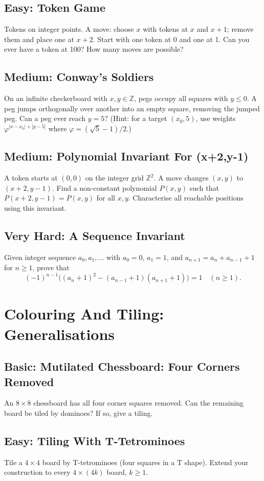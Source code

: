 \documentclass[12pt]{article}
\begin{document}
\subsection*{Easy: Token Game}
Tokens on integer points. A move: choose $x$ with tokens at $x$ and
$x+1$; remove them and place one at $x+2$. Start with one token at 0
and one at 1. Can you ever have a token at 100? How many moves are
possible?

\subsection*{Medium: Conway's Soldiers}
On an infinite checkerboard with $x,y\in\mathbb Z$, pegs occupy all
squares with $y \le 0$.
A peg jumps orthogonally over another into an empty square, removing
the jumped peg. Can a peg ever reach $y=5$? (Hint: for a target
$(x_0,5)$, use weights $\varphi^{|x-x_0|+|y-5|}$ where
$\varphi=(\sqrt5-1)/2$.)

\subsection*{Medium: Polynomial Invariant For (x+2,y-1)}
A token starts at $(0,0)$ on the integer grid $\mathbb Z^2$. A move
changes $(x,y)$ to $(x+2,y-1)$.
Find a non-constant polynomial $P(x,y)$ such that $P(x+2,y-1)=P(x,y)$
for all $x,y$. Characterise all reachable positions using this
invariant.

\subsection*{Very Hard: A Sequence Invariant}
Given integer sequence $a_0, a_1, \ldots$ with $a_0 = 0$, $a_1 = 1$,
and $a_{n+1} = a_n + a_{n-1} + 1$ for $n\ge1$, prove that
\[
(-1)^{n-1}\bigl((a_n+1)^2-(a_{n-1}+1)(a_{n+1}+1)\bigr)=1
\quad(n\ge1).
\]

\section{Colouring And Tiling: Generalisations}

\subsection*{Basic: Mutilated Chessboard: Four Corners Removed}
An $8\times8$ chessboard has all four corner squares removed. Can the
remaining board be tiled by dominoes? If so, give a tiling.

\subsection*{Easy: Tiling With T-Tetrominoes}
Tile a $4\times4$ board by T-tetrominoes (four squares in a T shape).
Extend your construction to every $4\times(4k)$ board, $k\ge1$.
\end{document}

